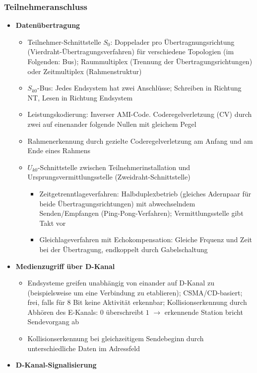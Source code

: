 \subsubsection{Teilnehmeranschluss}
\begin{itemize}
	\item \textbf{Datenübertragung}
	\begin{itemize}
		\item Teilnehmer-Schnittstelle \(S_0\): Doppelader pro Übertragnungsrichtung (Vierdraht-Übertragungsverfahren) für verschiedene Topologien (im Folgenden: Bus); Raummultiplex (Trennung der Übertragungsrichtungen) oder Zeitmultiplex (Rahmenstruktur)
		\item \(S_{k0}\)-Bus: Jedes Endsystem hat zwei Anschlüsse; Schreiben in Richtung NT, Lesen in Richtung Endsystem
		\item Leistungskodierung: Inverser AMI-Code. Coderegelverletzung (CV) durch zwei auf einenander folgende Nullen mit gleichem Pegel
		\item Rahmenerkennung durch gezielte Coderegelverletzung am Anfang und am Ende eines Rahmens
		\item \(U_{k0}\)-Schnittstelle zwischen Teilnehmerinstallation und Ursprungsvermittlungsstelle (Zweidraht-Schnittstelle)
		\begin{itemize}
			\item Zeitgetrenntlageverfahren: Halbduplexbetrieb (gleiches Adernpaar für beide Übertragungsrichtungen) mit abwechselndem Senden/Empfangen (Ping-Pong-Verfahren); Vermittlungsstelle gibt Takt vor
			\item Gleichlageverfahren mit Echokompensation: Gleiche Frquenz und Zeit bei der Übertragung, endkoppelt durch Gabelschaltung
		\end{itemize}
	\end{itemize}
	\item \textbf{Medienzugriff über D-Kanal}
	\begin{itemize}
		\item Endsysteme greifen unabhängig von einander auf D-Kanal zu (beispielsweise um eine Verbindung zu etablieren); CSMA/CD-basiert; frei, falls für 8 Bit keine Aktivität erkennbar; Kollisionserkennung durch Abhören des E-Kanals: \(0\) überschreibt \(1\) \(\rightarrow\) erkennende Station bricht Sendevorgang ab
		\item Kollisionserkennung bei gleichzeitigem Sendebeginn durch unterschiedliche Daten im Adressfeld
	\end{itemize}
	\item \textbf{D-Kanal-Signalisierung}

\end{itemize}
